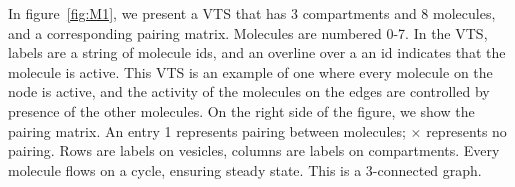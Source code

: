 

\begin{example}
%
In figure~\ref{fig:M1}, we present a VTS that has 3 compartments and 8 molecules, and a corresponding pairing matrix. Molecules are numbered 0-7. In the VTS, labels are a string of molecule ids, and an overline over a an id indicates that the molecule is active. This VTS is an example of one where every molecule on the node is active, and the activity of the molecules on the edges are controlled by presence of the other molecules. On the right side of the figure, we show the pairing matrix. An entry 1 represents pairing between molecules; $\times$ represents no pairing. Rows are labels on vesicles, columns are labels on compartments. Every molecule flows on a cycle, ensuring steady state. This is a 3-connected graph.
\end{example}

